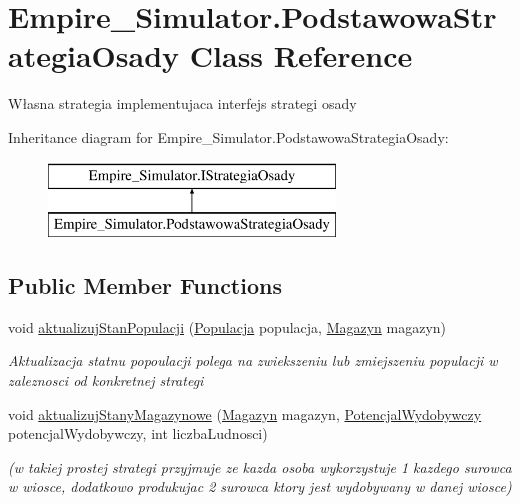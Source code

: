 \hypertarget{class_empire___simulator_1_1_podstawowa_strategia_osady}{\section{Empire\+\_\+\+Simulator.\+Podstawowa\+Strategia\+Osady Class Reference}
\label{class_empire___simulator_1_1_podstawowa_strategia_osady}
}


Własna strategia implementujaca interfejs strategi osady  


Inheritance diagram for Empire\+\_\+\+Simulator.\+Podstawowa\+Strategia\+Osady\+:\begin{figure}[H]
\begin{center}
\leavevmode
\includegraphics[height=2.000000cm]{class_empire___simulator_1_1_podstawowa_strategia_osady}
\end{center}
\end{figure}
\subsection*{Public Member Functions}
\begin{DoxyCompactItemize}
\item 
void \hyperlink{class_empire___simulator_1_1_podstawowa_strategia_osady_a44cd6153770830086b7616b657d90e4e}{aktualizuj\+Stan\+Populacji} (\hyperlink{class_empire___simulator_1_1_populacja}{Populacja} populacja, \hyperlink{class_empire___simulator_1_1_magazyn}{Magazyn} magazyn)
\begin{DoxyCompactList}\small\item\em Aktualizacja statnu popoulacji polega na zwiekszeniu lub zmiejszeniu populacji w zaleznosci od konkretnej strategi \end{DoxyCompactList}\item 
void \hyperlink{class_empire___simulator_1_1_podstawowa_strategia_osady_acf471696a52414814bd0608005c9518d}{aktualizuj\+Stany\+Magazynowe} (\hyperlink{class_empire___simulator_1_1_magazyn}{Magazyn} magazyn, \hyperlink{class_empire___simulator_1_1_potencjal_wydobywczy}{Potencjal\+Wydobywczy} potencjal\+Wydobywczy, int liczba\+Ludnosci)
\begin{DoxyCompactList}\small\item\em (w takiej prostej strategi przyjmuje ze kazda osoba wykorzystuje 1 kazdego surowca w wiosce, dodatkowo produkujac 2 surowca ktory jest wydobywany w danej wiosce) \end{DoxyCompactList}\end{DoxyCompactItemize}


